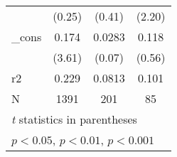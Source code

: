 \begin{table}[htbp]
\begin{tabular}{l*{3}{c}}
            &      (0.25)         &      (0.41)         &      (2.20)         \\
[1em]
\_cons      &       0.174\sym{***}&      0.0283         &       0.118         \\
            &      (3.61)         &      (0.07)         &      (0.56)         \\
\hline
r2          &       0.229         &      0.0813         &       0.101         \\
N           &        1391         &         201         &          85         \\
\hline\hline
\multicolumn{4}{l}{\footnotesize \textit{t} statistics in parentheses}\\
\multicolumn{4}{l}{\footnotesize \sym{*} \(p<0.05\), \sym{**} \(p<0.01\), \sym{***} \(p<0.001\)}\\
\end{tabular}
\end{table}
